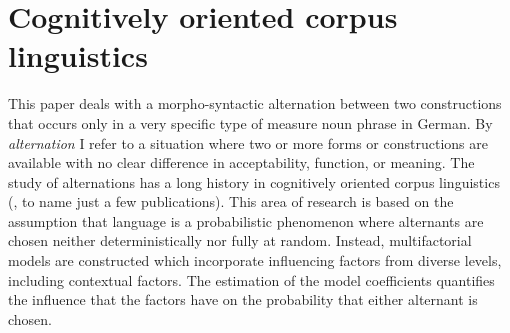 \documentclass[USenglish]{article}
\begin{document}
  
\maketitle





\section{Cognitively oriented corpus linguistics}
\label{sec:cogocl}

This paper deals with a morpho-syntactic alternation between two constructions that occurs only in a very specific type of measure noun phrase in German.
By \textit{alternation} I refer to a situation where two or more forms or constructions are available with no clear difference in acceptability, function, or meaning.
The study of alternations has a long history in cognitively oriented corpus linguistics (\citealp{BresnanEa2007,BresnanHay2010,BresnanFord2010,DivjakArppe2013,Gries2015,NessetJanda2010}, to name just a few publications).
This area of research is based on the assumption that language is a probabilistic phenomenon \citep{Bresnan2007} where alternants are chosen neither deterministically nor fully at random.
Instead, multifactorial models are constructed which incorporate influencing factors from diverse levels, including contextual factors.
The estimation of the model coefficients quantifies the influence that the factors have on the probability that either alternant is chosen.
\end{document}
